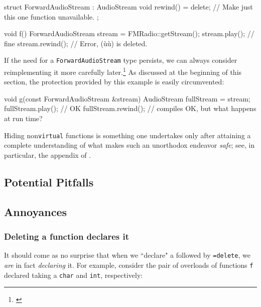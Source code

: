 \begin{emcppslisting}[emcppsbatch=e2]
struct ForwardAudioStream : AudioStream
{
    void rewind() = delete; // Make just this one function unavailable.
};

void f()
{
    ForwardAudioStream stream = FMRadio::getStream();
    stream.play();   // fine
    stream.rewind(); // Error, (ù{}ù) is deleted.
}
\end{emcppslisting}

\noindent If the need for a \lstinline!ForwardAudioStream! type persists, we can always
consider reimplementing it more carefully later.{\cprotect\footnote{\cite[sections 3.5.10.5 and 3.7.3, pp.~687--703 and 726--727]{lakos20}}} As discussed at the beginning of this section, the protection provided by this example is easily circumvented:
\begin{emcppslisting}[emcppsbatch=e2]
void g(const ForwardAudioStream &stream)
{
    AudioStream fullStream = stream;
    fullStream.play();   // OK
    fullStream.rewind(); // compiles OK, but what happens at run time?
}
\end{emcppslisting}

\noindent Hiding non\lstinline!virtual! functions is something one undertakes only after attaining a complete understanding of what makes such an unorthodox endeavor \emph{safe}; see, in particular, the appendix of .

\subsection[Potential Pitfalls]{Potential Pitfalls}\label{potential-pitfalls}

\hspace*{\fill}

\subsection[Annoyances]{Annoyances}\label{annoyances}

\subsubsection[Deleting a function declares it]{Deleting a function declares it}

It should come as no surprise that when we ``declare" a 
followed by \lstinline!=delete!, we \emph{are} in fact \emph{declaring} it.  For example, consider
the pair of overloads of functions \lstinline!f! declared taking a \lstinline!char! and \lstinline!int!,
respectively:


